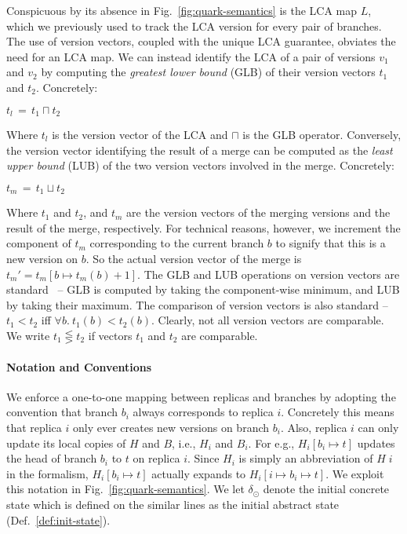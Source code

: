 Conspicuous by its absence in Fig.~\ref{fig:quark-semantics} is the
LCA map $L$, which we previously used to track the LCA version for
every pair of branches. The use of version vectors, coupled with the
unique LCA guarantee, obviates the need for an LCA map.  We can
instead identify the LCA of a pair of versions $v_1$ and $v_2$ by
computing the \emph{greatest lower bound} (GLB) of their version
vectors $t_1$ and $t_2$. Concretely:
\begin{center}
  $t_l \,=\, t_1 \sqcap t_2$
\end{center}
Where $t_l$ is the version vector of the LCA and $\sqcap$ is the GLB
operator. Conversely, the version vector identifying the result of a
merge can be computed as the \emph{least upper bound} (LUB) of the two
version vectors involved in the merge. Concretely:
\begin{center}
  $t_m \,=\, t_1 \sqcup t_2$
\end{center}
Where $t_1$ and $t_2$, and $t_m$ are the version vectors of the
merging versions and the result of the merge, respectively. For
technical reasons, however, we increment the component of $t_m$
corresponding to the current branch $b$ to signify that this is a new
version on $b$. So the actual version vector of the merge is $t_m' =
t_m[b \mapsto t_m(b)+1]$. The GLB and LUB operations on version
vectors are standard~\cite{vectorclock} -- GLB is computed by taking
the component-wise minimum, and LUB by taking their maximum. The
comparison of version vectors is also standard -- $t_1 < t_2$ iff
$\forall b.~t_1(b) < t_2(b)$. Clearly, not all version vectors are
comparable. We write $t_1 \lesseqgtr t_2$ if vectors $t_1$ and $t_2$
are comparable.

\paragraph{Notation and Conventions} We enforce a one-to-one mapping
between replicas and branches by adopting the convention that branch
$b_i$ always corresponds to replica $i$. Concretely this means that
replica $i$ only ever creates new versions on branch $b_i$. Also,
replica $i$ can only update its local copies of $H$ and $B$, i.e.,
$H_i$ and $B_i$. For e.g., $H_i[b_i \mapsto t]$ updates the head of
branch $b_i$ to $t$ on replica $i$.  Since $H_i$ is simply an
abbreviation of $H\;i$ in the formalism, $H_i[b_i \mapsto t]$ actually
expands to $H_i[i \mapsto b_i \mapsto t]$. We exploit this notation in
Fig.~\ref{fig:quark-semantics}. We let $\delta_{\odot}$ denote the
initial concrete state which is defined on the similar lines as the
initial abstract state (Def.~\ref{def:init-state}).

